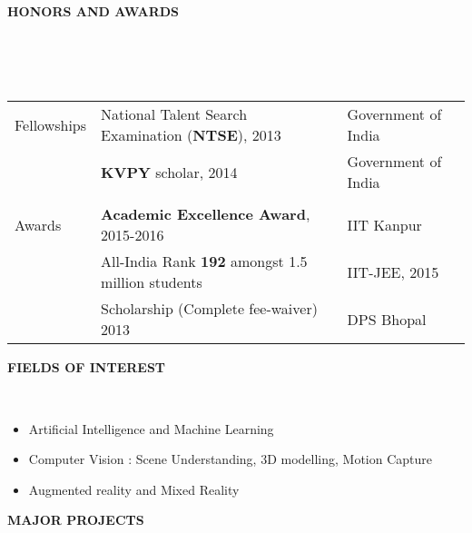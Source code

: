 \documentclass[a4paper,10pt]{article}
\newcommand{\lsep}{-0.5cm}
\newcommand{\resheading}[1]{{\small \colorbox{mygrey}{\begin{minipage}{0.975\textwidth}{\textbf{#1 \vphantom{p\^{E}}}}\end{minipage}}}}
\begin{document}
\resheading{\textbf{HONORS AND AWARDS} }\\[\lsep]
\\ \\
\indent \begin{tabular}{l@{\hskip 0.24in}| @{\hskip 0.1in} l @{\hskip 0.3in} l}
Fellowships & National Talent Search Examination (\textbf{NTSE}), 2013 & Government of India\\
&  \textbf{KVPY} scholar, 2014 & Government of India\\
\\
Awards & \textbf{Academic Excellence Award}, 2015-2016 & IIT Kanpur\\
& All-India Rank \textbf{192} amongst 1.5 million students & IIT-JEE, 2015\\
& Scholarship (Complete fee-waiver) 2013 & DPS Bhopal\\
\end{tabular}
\resheading{\textbf{FIELDS OF INTEREST} }\\[\lsep]
\begin{itemize}
\item Artificial Intelligence and Machine Learning
\item Computer Vision : Scene Understanding, 3D modelling, Motion Capture
\item Augmented reality and Mixed Reality
\end{itemize}
\resheading{\textbf{MAJOR PROJECTS} }\\[\lsep]
\end{document}
